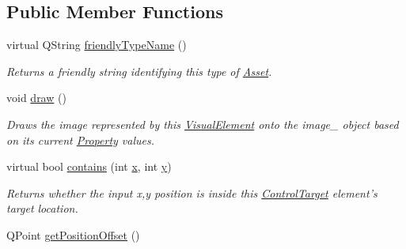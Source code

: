 \subsection*{Public Member Functions}
\begin{DoxyCompactItemize}
\item 
virtual Q\-String \hyperlink{class_picto_1_1_circle_target_ae7518ab3a7f181990598c0830aa48e31}{friendly\-Type\-Name} ()
\begin{DoxyCompactList}\small\item\em Returns a friendly string identifying this type of \hyperlink{class_picto_1_1_asset}{Asset}. \end{DoxyCompactList}\item 
\hypertarget{class_picto_1_1_circle_target_a0db488efad0239625d4e9626c1099c29}{void \hyperlink{class_picto_1_1_circle_target_a0db488efad0239625d4e9626c1099c29}{draw} ()}\label{class_picto_1_1_circle_target_a0db488efad0239625d4e9626c1099c29}

\begin{DoxyCompactList}\small\item\em Draws the image represented by this \hyperlink{struct_picto_1_1_visual_element}{Visual\-Element} onto the image\-\_\- object based on its current \hyperlink{class_picto_1_1_property}{Property} values. \end{DoxyCompactList}\item 
\hypertarget{class_picto_1_1_circle_target_a4e0ace2de1f3a73e9a9033947472e7b2}{virtual bool \hyperlink{class_picto_1_1_circle_target_a4e0ace2de1f3a73e9a9033947472e7b2}{contains} (int \hyperlink{struct_picto_1_1_visual_element_a1b50bc5fa41868f661687015be3c97e8}{x}, int \hyperlink{struct_picto_1_1_visual_element_a9a4db3430219e1f78208eda1a89e9f38}{y})}\label{class_picto_1_1_circle_target_a4e0ace2de1f3a73e9a9033947472e7b2}

\begin{DoxyCompactList}\small\item\em Returns whether the input x,y position is inside this \hyperlink{class_picto_1_1_control_target}{Control\-Target} element's target location. \end{DoxyCompactList}\item 
\hypertarget{class_picto_1_1_circle_target_a8741240649eac420b8043ffb57ced79f}{Q\-Point \hyperlink{class_picto_1_1_circle_target_a8741240649eac420b8043ffb57ced79f}{get\-Position\-Offset} ()}\label{class_picto_1_1_circle_target_a8741240649eac420b8043ffb57ced79f}


\end{DoxyCompactItemize}
